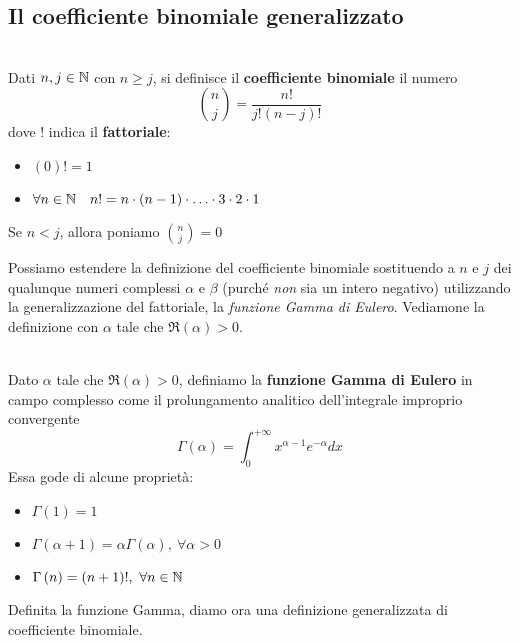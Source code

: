 \subsection{Il coefficiente binomiale generalizzato}\label{coefficientebinomialgeneralizzato}
\begin{define}~{}\\
	Dati $n,j\in\mathbb{N}$ con $n\geq j$, si definisce il \textbf{coefficiente binomiale} il numero
	\begin{equation}
		\binom{n}{j}=\frac{n!}{j!\left(n-j\right)!}
	\end{equation}
dove $!$ indica il \textbf{fattoriale}:
\begin{itemize}
	\item $\left(0\right)!=1$
	\item $\forall n\in\mathbb{N}\quad n!=n\cdot \left(n-1\right)\cdot \ldots \cdot 3 \cdot 2 \cdot 1$
\end{itemize}
Se $n<j$, allora poniamo $\displaystyle\binom{n}{j}=0$
\end{define}
Possiamo estendere la definizione del coefficiente binomiale sostituendo a $n$ e $j$ dei qualunque numeri complessi $\alpha$ e $\beta$ (purché \textit{non} sia un intero negativo)  utilizzando la generalizzazione del fattoriale, la \textit{funzione Gamma di Eulero}. Vediamone la definizione con $\alpha$ tale che $\Re\left(\alpha\right)>0$.
\begin{define}~{}\\
	Dato $\alpha$ tale che $\Re\left(\alpha\right)>0$, definiamo la \textbf{funzione Gamma di Eulero} in campo complesso come il prolungamento analitico dell'integrale improprio convergente
	\begin{equation}
		\Gamma\left(\alpha\right)=\int_{0}^{+\infty}x^{\alpha-1}e^{-\alpha}dx
	\end{equation}
	Essa gode di alcune proprietà:
	\begin{itemize}
		\item $\Gamma\left(1\right)=1$
		\item $\Gamma\left(\alpha+1\right)=\alpha\Gamma\left(\alpha\right),\ \forall\alpha>0$
		\item $\Gamma\left(n\right)=\left(n+1\right)!,\ \forall n\in\mathbb{N}$
	\end{itemize}
\end{define}
Definita la funzione Gamma, diamo ora una definizione generalizzata di coefficiente binomiale.
